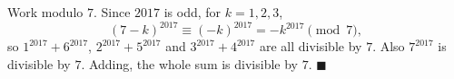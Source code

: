 Work modulo $7$. Since $2017$ is odd, for $k=1,2,3$,
\[
(7-k)^{2017}\equiv(-k)^{2017}=-k^{2017}\pmod 7,
\]
so $1^{2017}+6^{2017}$, $2^{2017}+5^{2017}$ and $3^{2017}+4^{2017}$ are all divisible by $7$. Also $7^{2017}$ is divisible by $7$. Adding, the whole sum is divisible by $7$. $\blacksquare$
